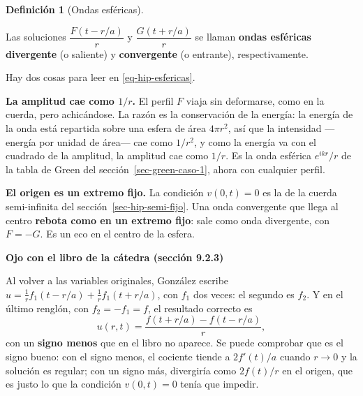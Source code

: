 \documentclass[
  spanish,
  a4paper,
]{scrbook}
\theoremstyle{definition}
\newtheorem{definition}{Definición}[chapter]
\theoremstyle{plain}
\theoremstyle{definition}
\theoremstyle{plain}
\theoremstyle{definition}
\theoremstyle{remark}
\begin{document}
\begin{definition}[Ondas
esféricas]\protect\hypertarget{def-hip-onda-esferica}{}\label{def-hip-onda-esferica}

Las soluciones \(\dfrac{F(t-r/a)}{r}\) y \(\dfrac{G(t+r/a)}{r}\) se
llaman \textbf{ondas esféricas} \textbf{divergente} (o saliente) y
\textbf{convergente} (o entrante), respectivamente.

\end{definition}

Hay dos cosas para leer en \ref{eq-hip-esfericas}.

\textbf{La amplitud cae como \(1/r\).} El perfil \(F\) viaja sin
deformarse, como en la cuerda, pero achicándose. La razón es la
conservación de la energía: la energía de la onda está repartida sobre
una esfera de área \(4\pi r^2\), así que la intensidad ---energía por
unidad de área--- cae como \(1/r^2\), y como la energía va con el
cuadrado de la amplitud, la amplitud cae como \(1/r\). Es la onda
esférica \(e^{ikr}/r\) de la tabla de Green del
sección~\ref{sec-green-caso-1}, ahora con cualquier perfil.

\textbf{El origen es un extremo fijo.} La condición \(v(0,t) = 0\) es la
de la cuerda semi-infinita del sección~\ref{sec-hip-semi-fijo}. Una onda
convergente que llega al centro \textbf{rebota como en un extremo fijo}:
sale como onda divergente, con \(F = -G\). Es un eco en el centro de la
esfera.

\begin{tcolorbox}[enhanced jigsaw, arc=.35mm, bottomrule=.15mm, breakable, colback=white, colframe=quarto-callout-warning-color-frame, left=2mm, leftrule=.75mm, opacityback=0, rightrule=.15mm, toprule=.15mm]
\begin{minipage}[t]{5.5mm}
\textcolor{quarto-callout-warning-color}{\faExclamationTriangle}
\end{minipage}%
\begin{minipage}[t]{\textwidth - 5.5mm}

\vspace{-3mm}\textbf{Ojo con el libro de la cátedra (sección 9.2.3)}\vspace{3mm}

Al volver a las variables originales, González escribe
\(u = \tfrac1r f_1(t-r/a) + \tfrac1r f_1(t+r/a)\), con \(f_1\) dos
veces: el segundo es \(f_2\). Y en el último renglón, con
\(f_2 = -f_1 = f\), el resultado correcto es
\[u(r,t) = \frac{f(t+r/a) - f(t-r/a)}{r},\] con un \textbf{signo menos}
que en el libro no aparece. Se puede comprobar que es el signo bueno:
con el signo menos, el cociente tiende a \(2f'(t)/a\) cuando \(r\to0\) y
la solución es regular; con un signo más, divergiría como \(2f(t)/r\) en
el origen, que es justo lo que la condición \(v(0,t)=0\) tenía que
impedir.

\end{minipage}%
\end{tcolorbox}
\end{document}
